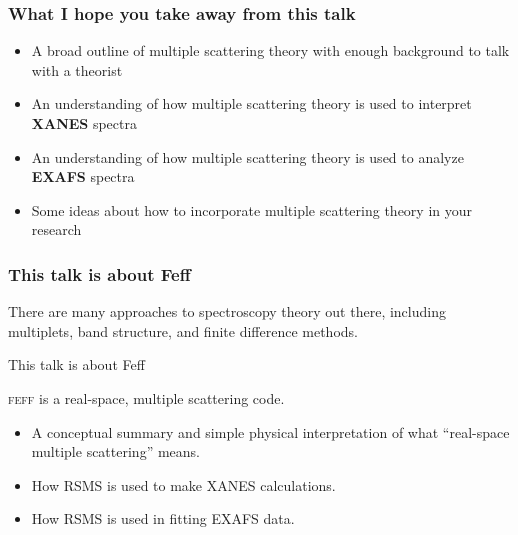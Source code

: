 

\begin{frame}
  \frametitle{What I hope you take away from this talk}
  \begin{itemize}
  \item A broad outline of multiple scattering theory with enough
    background to talk with a theorist
  \item An understanding of how multiple scattering theory is used to
    interpret \textbf{XANES} spectra
  \item An understanding of how multiple scattering theory is used to
    analyze \textbf{EXAFS} spectra
  \item Some ideas about how to incorporate multiple scattering theory
    in your research
  \end{itemize}
\end{frame}

\begin{frame}
  \frametitle{This talk is about Feff}

  There are many approaches to spectroscopy theory out there,
  including multiplets, band structure, and finite difference methods.

  \bigskip

  \begin{exampleblock}{This talk is about Feff}
    \begin{center}
      \textsc{feff} is a real-space, multiple scattering code.
    \end{center}
  \end{exampleblock}
  
  \bigskip

  \begin{itemize}
  \item A conceptual summary and simple physical interpretation of
    what ``real-space multiple scattering'' means.
  \item How RSMS is used to make XANES calculations.
  \item How RSMS is used in fitting EXAFS data.
  \end{itemize}

\end{frame}



